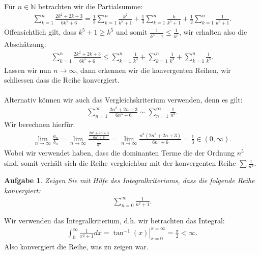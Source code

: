\documentclass[a4paper, 20]{exam}
\newtheorem{ex}{Aufgabe}
\begin{document}
\begin{solution} Für $n \in \mathbb{N}$ betrachten wir die Partialsumme:
\begin{align*}
\sum_{k=1}^n \frac{2k^2 +2k+3}{6k^5+6} = \frac{1}{3} \sum_{k=1}^n \frac{k^2}{k^5+1} + \frac{1}{3} \sum_{k=1}^n \frac{k}{k^5+1} + \frac{1}{2} \sum_{k=1}^n \frac{1}{k^5 +1}. 
\end{align*}
Offensichtlich gilt, dass $k^5+1 \geq k^5$ und somit $\frac{1}{k^5+1} \leq \frac{1}{k^5}$, wir erhalten also die Abschätzung:
\begin{align*}
\sum_{k=1}^n \frac{2k^2 +2k+3}{6k^5+6} \leq \sum_{k=1}^n \frac{1}{k^3} + \sum_{k=1}^n \frac{1}{k^4} + \sum_{k=1}^n \frac{1}{k^5}.
\end{align*}
Lassen wir nun $n \longrightarrow \infty$, dann erkennen wir die konvergenten Reihen,  wir schliessen dass die Reihe konvergiert. 
\\\\
Alternativ können wir auch das Vergleichskriterium verwenden, denn es gilt:
\begin{align*}
\sum_{n=1}^\infty \frac{2n^2 + 2n +3}{6n^5 +6} \sim \sum_{n=1}^\infty \frac{1}{n^3}.
\end{align*}
Wir berechnen hierfür:
\begin{align*}
\lim_{n \rightarrow \infty} \frac{a_n}{b_n} = \lim_{n \rightarrow \infty} \frac{\frac{2n^2 + 2n +3}{6n^5 + 6}}{\frac{1}{n^3}} = \lim_{ n \rightarrow \infty} \frac{n^3(2n^2+2n+3)}{6n^5+6}= \frac{1}{3} \in (0, \infty).
\end{align*}
Wobei wir verwendet haben, dass die dominanten Terme die der Ordnung $n^5$ sind, somit verhält sich die Reihe vergleichbar mit der konvergenten Reihe $\sum \frac{1}{n^3}$. 
\end{solution}


\begin{ex} Zeigen Sie mit Hilfe des Integralkriteriums, dass die folgende Reihe konvergiert:
\begin{align*}
\sum_{n=0}^\infty \frac{1}{n^2+1}.
\end{align*}
\end{ex}


\begin{solution} Wir verwenden das Integralkriterium, d.h. wir betrachten das Integral:
\begin{align*}
\int_0^\infty \frac{1}{x^2 +1}dx = \left. \tan^{-1}(x)\right|_{x=0}^{x=\infty} = \frac{\pi}{2} < \infty.   
\end{align*}
Also konvergiert die Reihe, was zu zeigen war. 
\end{solution}
\end{document}
